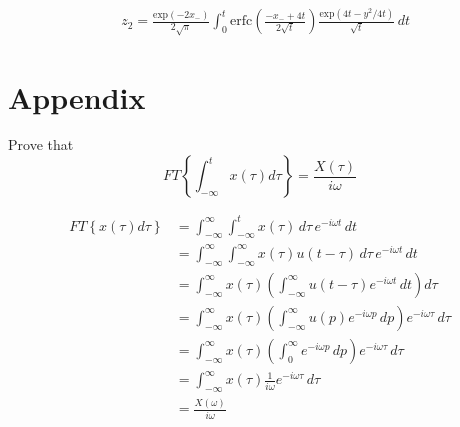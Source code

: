 \documentclass[10pt,a4,fleqn]{article}
\begin{document}
\begin{equation}
\begin{aligned}
    &{z}_2 =  \frac{\mathrm{exp}(-2x_-)}{2\sqrt{\pi}}\int_0^t\mathrm{erfc}\left(\frac{-x_- + 4t}{2\sqrt{t}}\right) \frac{\mathrm{exp}\left(4t - y^2/4t\right)}{\sqrt{t}}\,dt 
\end{aligned}
\end{equation}
\clearpage
\section{Appendix}
\appendix

Prove that 
\begin{equation}
    FT\left\{\int_{-\infty}^t  x(\tau)d\tau \right\} = \frac{X(\tau)}{i\omega}
\end{equation}

\begin{equation}
\begin{aligned}
    FT\left\{x(\tau)d\tau \right\} &= \int_{-\infty}^{\infty} \int_{-\infty}^t x(\tau) \, d\tau \, e^{-i\omega t}\,dt \\
    &= \int_{-\infty}^{\infty} \int_{-\infty}^{\infty} x(\tau) u(t -\tau ) \, d\tau \, e^{-i\omega t}\,dt \\
    &= \int_{-\infty}^{\infty} x(\tau) \left( \int_{-\infty}^{\infty} u( t- \tau)  e^{-i\omega t} \, dt \right) d \tau \\
    &= \int_{-\infty}^{\infty} x(\tau) \left(  \int_{-\infty}^{\infty} u(p) e^{-i\omega p} \, dp  \right) e^{-i\omega \tau } \, d\tau  \\
    &= \int_{-\infty}^{\infty} x(\tau) \left( \int_0^{\infty} e^{-i\omega p} \, dp\right) e^{-i\omega \tau} \, d\tau\\
    &= \int_{-\infty}^{\infty} x(\tau) \frac{1}{i \omega } e^{-i\omega \tau} \, d\tau\\
    &= \frac{X(\omega)}{i \omega }    
    \end{aligned}
\end{equation}
\end{document}
